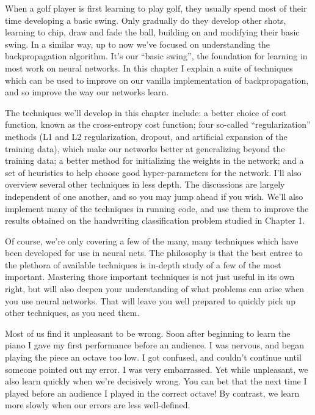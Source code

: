 
When a golf player is first learning to play golf, they usually spend most of their time developing a basic swing. Only gradually do they develop other shots, learning to chip, draw and fade the ball, building on and modifying their basic swing. In a similar way, up to now we've focused on understanding the backpropagation algorithm. It's our ``basic swing'', the foundation for learning in most work on neural networks. In this chapter I explain a suite of techniques which can be used to improve on our vanilla implementation of backpropagation, and so improve the way our networks learn.


The techniques we'll develop in this chapter include: a better choice of cost function, known as the cross-entropy cost function; four so-called ``regularization'' methods (L1 and L2 regularization, dropout, and artificial expansion of the training data), which make our networks better at generalizing beyond the training data; a better method for initializing the weights in the network; and a set of heuristics to help choose good hyper-parameters for the network. I'll also overview several other techniques in less depth. The discussions are largely independent of one another, and so you may jump ahead if you wish. We'll also implement many of the techniques in running code, and use them to improve the results obtained on the handwriting classification problem studied in Chapter 1.


Of course, we're only covering a few of the many, many techniques which have been developed for use in neural nets. The philosophy is that the best entree to the plethora of available techniques is in-depth study of a few of the most important. Mastering those important techniques is not just useful in its own right, but will also deepen your understanding of what problems can arise when you use neural networks. That will leave you well prepared to quickly pick up other techniques, as you need them.





Most of us find it unpleasant to be wrong. Soon after beginning to learn the piano I gave my first performance before an audience. I was nervous, and began playing the piece an octave too low. I got confused, and couldn't continue until someone pointed out my error. I was very embarrassed. Yet while unpleasant, we also learn quickly when we're decisively wrong. You can bet that the next time I played before an audience I played in the correct octave! By contrast, we learn more slowly when our errors are less well-defined.


